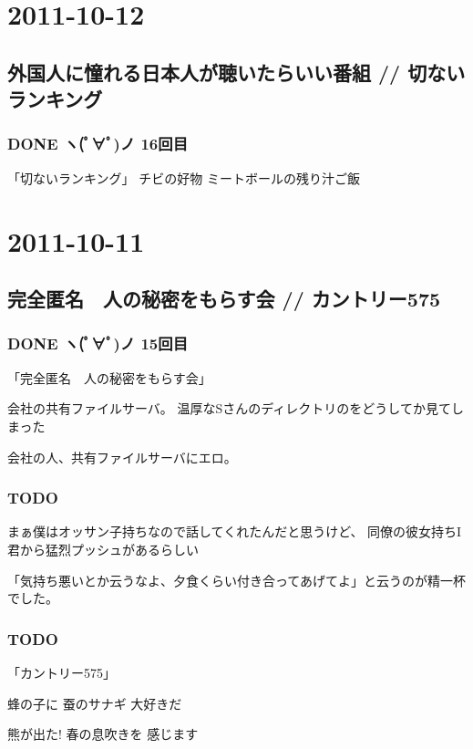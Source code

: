 \documentclass[11pt]{article}
\begin{document}
\section{2011-10-12}
\label{sec-58}
\subsection{外国人に憧れる日本人が聴いたらいい番組 // 切ないランキング}
\label{sec-58_1}
\subsubsection{\textbf{DONE} ヽ(ﾟ∀ﾟ)ノ 16回目}
\label{sec-58_1_1}

「切ないランキング」
チビの好物 ミートボールの残り汁ご飯
\section{2011-10-11}
\label{sec-59}
\subsection{完全匿名　人の秘密をもらす会 // カントリー575}
\label{sec-59_1}
\subsubsection{\textbf{DONE} ヽ(ﾟ∀ﾟ)ノ 15回目}
\label{sec-59_1_1}

「完全匿名　人の秘密をもらす会」

会社の共有ファイルサーバ。
温厚なSさんのディレクトリのをどうしてか見てしまった

会社の人、共有ファイルサーバにエロ。
\subsubsection{\textbf{TODO}}
\label{sec-59_1_2}

まぁ僕はオッサン子持ちなので話してくれたんだと思うけど、
同僚の彼女持ちI君から猛烈プッシュがあるらしい

「気持ち悪いとか云うなよ、夕食くらい付き合ってあげてよ」と云うのが精一杯でした。
\subsubsection{\textbf{TODO}}
\label{sec-59_1_3}

「カントリー575」

蜂の子に 蚕のサナギ 大好きだ

熊が出た! 春の息吹きを 感じます
\end{document}
